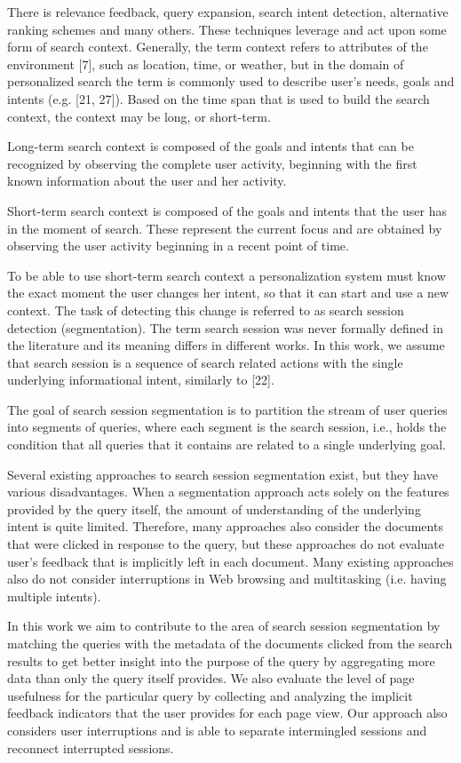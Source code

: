 \documentclass{acm_proc_article-sp} %
\begin{document}
There is relevance feedback, query expansion, search intent
detection, alternative ranking schemes and many others.
These techniques leverage and act upon some form of search
context. Generally, the term context refers to attributes of
the environment [7], such as location, time, or weather, but
in the domain of personalized search the term is commonly
used to describe user’s needs, goals and intents (e.g. [21, 27]).
Based on the time span that is used to build the search context,
the context may be long, or short-term.

Long-term search context is composed of the goals and intents
that can be recognized by observing the complete user
activity, beginning with the first known information about
the user and her activity.

Short-term search context is composed of the goals and intents
that the user has in the moment of search. These
represent the current focus and are obtained by observing
the user activity beginning in a recent point of time.

To be able to use short-term search context a personalization
system must know the exact moment the user changes
her intent, so that it can start and use a new context. The
task of detecting this change is referred to as search session
detection (segmentation). The term search session was
never formally defined in the literature and its meaning differs
in different works. In this work, we assume that search
session is a sequence of search related actions with the single
underlying informational intent, similarly to [22].

The goal of search session segmentation is to partition the
stream of user queries into segments of queries, where each
segment is the search session, i.e., holds the condition that
all queries that it contains are related to a single underlying
goal.

Several existing approaches to search session segmentation
exist, but they have various disadvantages. When a segmentation
approach acts solely on the features provided by the
query itself, the amount of understanding of the underlying
intent is quite limited. Therefore, many approaches also
consider the documents that were clicked in response to the
query, but these approaches do not evaluate user’s feedback
that is implicitly left in each document. Many existing approaches
also do not consider interruptions in Web browsing
and multitasking (i.e. having multiple intents).

In this work we aim to contribute to the area of search session
segmentation by matching the queries with the metadata
of the documents clicked from the search results to get
better insight into the purpose of the query by aggregating
more data than only the query itself provides. We also
evaluate the level of page usefulness for the particular query
by collecting and analyzing the implicit feedback indicators
that the user provides for each page view. Our approach
also considers user interruptions and is able to separate intermingled
sessions and reconnect interrupted sessions.
\end{document}
